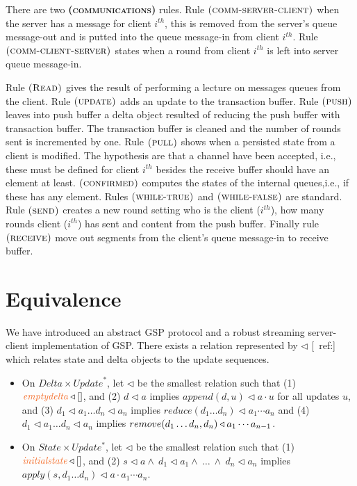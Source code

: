 \documentclass[envcountsect,runningheads,orivec]{llncs}
\begin{document}
There are two \textbf{\textsc{(communications)}} rules. Rule $\textsc{(comm-server-client)}$ when the server has a message for client $i^{th}$, this is removed from the server's queue message-out and is putted into the queue message-in from client $i^{th}$. Rule $\textsc{(comm-client-server)}$ states when a round from client $i^{th}$ is left into server queue message-in.

Rule $\textsc{(Read)}$ gives the result of performing a lecture on messages queues from the client. Rule $\textsc{(update)}$ adds an update to the transaction buffer. Rule $\textsc{(push)}$ leaves into push buffer a delta object resulted of reducing the push buffer with transaction buffer. The transaction buffer is cleaned and the number of rounds sent is incremented by one. Rule $\textsc{(pull)}$ shows when a persisted state from a client is modified. The hypothesis are that a channel have been accepted, i.e., these must be defined for client $i^{th}$ besides the receive buffer should have an element at least. $\textsc{(confirmed)}$
computes the states of the internal queues,i.e., if these has any element. Rules $\textsc{(while-true)}$ and $\textsc{(while-false)}$ are standard. Rule $\textsc{(send)}$ creates a new round setting who is the client ($i^{th}$), how many rounds client ($i^{th}$) has sent and content from the push buffer. Finally rule $\textsc{(receive)}$ move out segments from the client's queue message-in to receive buffer.

\section{Equivalence}

We have introduced an abstract GSP protocol and a robust streaming server-client implementation of GSP. There exists a relation represented by $\triangleleft$ [~ref:] which relates state and delta objects to the update sequences. 
\begin{itemize}
	\item On $\mathit{Delta} \times \mathit{Update}^*$, let $\triangleleft$ be the smallest relation such that (1) $\emptydelta \triangleleft []$, and
(2) $d \triangleleft a$ implies $append(d,u) \triangleleft a \cdot u$ for all updates $u$, and (3) $d_1 \triangleleft a_1 \ldots d_n \triangleleft a_n$ implies $reduce(d_1 \ldots d_n) \triangleleft a_1 \cdots a_n$ and (4) $d_1 \triangleleft a_1 \ldots d_n \triangleleft a_n$ implies $remove(d_1 \ldots d_{n}, d_n) \triangleleft a_1 \cdots a_{n-1}$. 
  
\item On $State \times Update^*$, let $\triangleleft$ be the smallest relation such that (1) $\initialstate \triangleleft []$, and
(2) $s \triangleleft a \land \ d_1 \triangleleft a_1 \land \ \ldots \ \land \ d_n \triangleleft a_n$ implies $apply(s,d_1 \ldots d_n) \triangleleft a \cdot a_1 \cdots a_n$.
\end{itemize}
\end{document}

